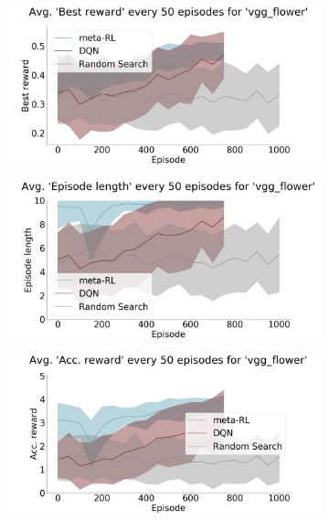 \begin{figure}[ht]
\begin{subfigure}{.33\textwidth}
  \caption{}
\label{fig:results:exp1:evolution:c}
\end{subfigure}
\begin{subfigure}{.33\textwidth}
  \centering
      \includegraphics[width=\linewidth]{imgs/chained/average-best_reward-vgg_flower.png}
  \caption{} 
\label{fig:results:exp1:evolution:d}
\end{subfigure}%
\begin{subfigure}{.33\textwidth}
  \centering
      \includegraphics[width=\linewidth]{imgs/chained/average-ep_length-vgg_flower.png}
  \caption{}
\label{fig:results:exp1:evolution:e}
\end{subfigure}%
\begin{subfigure}{.33\textwidth}
  \centering
      \includegraphics[width=\linewidth]{imgs/chained/average-acc_reward-vgg_flower.png}

\end{subfigure}
\end{figure}

